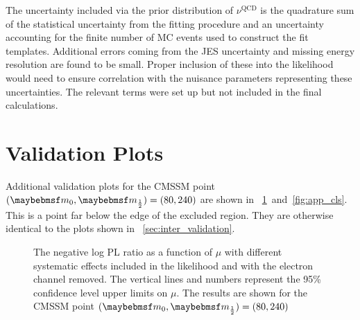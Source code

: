 The uncertainty included via the prior distribution of $\nu^{\textrm{QCD}}$ is
the quadrature sum of the statistical uncertainty from the fitting procedure and an
uncertainty accounting for the finite number of \ac{MC} events used to construct
the fit templates. Additional errors coming from the \ac{JES} uncertainty and
missing energy resolution are found to be small. Proper inclusion of these into
the likelihood would need to ensure correlation with the nuisance parameters
representing these uncertainties. The relevant terms were set up but not
included in the final calculations.

\section{Validation Plots}
\label{sec:app_inter_validation}
Additional validation plots for the \ac{CMSSM} point $(\Mzero, \Mhalf) = (80,
240)$ are shown in \figs~\ref{fig:app_pl}~and~\ref{fig:app_cls}. This is a
point far below the edge of the excluded region. They are otherwise identical to
the plots shown in \sec~\ref{sec:inter_validation}.


\begin{figure}[h!]
\centering
{}\quad
{}
\caption[The profile likelihood as a function of $\mu$]{The negative log \ac{PL}
  ratio as a function of $\mu$  with different
  systematic effects included in the likelihood and
   with the electron channel removed. The
  vertical lines and numbers represent the 95\% confidence level upper limits on
  $\mu$. The results are shown for the \ac{CMSSM} point $(\Mzero, \Mhalf) = (80,
  240)$}
\label{fig:app_pl}
\end{figure}


